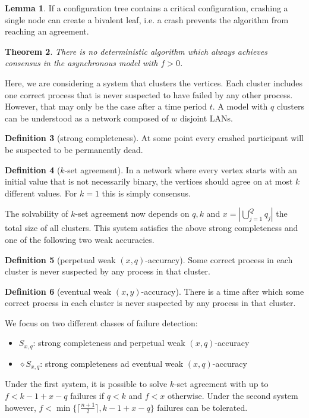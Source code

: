 \documentclass[a4paper, 12pt]{article}
\theoremstyle{plain}
\newtheorem{theorem}{Theorem}[section] %
\theoremstyle{definition}
\newtheorem{definition}[theorem]{Definition} %
\theoremstyle{lemma}
\newtheorem{lemma}[theorem]{Lemma}
\theoremstyle{remark}
\theoremstyle{corollary}
\theoremstyle{example}
\begin{document}
	\begin{lemma}
		If a configuration tree contains a critical configuration, crashing a single node can create a bivalent leaf, i.e. a crash prevents the algorithm from reaching an agreement.
	\end{lemma}
	\begin{theorem}
		There is no deterministic algorithm which always achieves consensus in the asynchronous model with $f>0$.
	\end{theorem}
	Here, we are considering a system that clusters the vertices. Each cluster includes one correct process that is never suspected to have failed by any other process. However, that may only be the case after a time period $t$. A model with $q$ clusters can be understood as a network composed of $w$ disjoint LANs. 
	\begin{definition}[strong completeness]
		At some point every crashed participant will be suspected to be permanently dead.
	\end{definition}
	\begin{definition}[$k$-set agreement]
		In a network where every vertex starts with an initial value that is not necessarily binary, the vertices should agree on at most $k$ different values. For $k=1$ this is simply consensus.
	\end{definition}
	The solvability of $k$-set agreement now depends on $q,k$ and $x = \left|\bigcup_{j=1}^Q q_j\right|$ the total size of all clusters. This system satisfies the above strong completeness and one of the following two weak accuracies.
	\begin{definition}[perpetual weak $(x,q)$-accuracy]
		Some correct process in each cluster is never suspected by any process in that cluster.
	\end{definition}
	\begin{definition}[eventual weak $(x,y)$-accuracy]
		There is a time after which some correct process in each cluster is never suspected by any process in that cluster.
	\end{definition}
	We focus on two different classes of failure detection:
	\begin{itemize}
		\item $S_{x,q}$: strong completeness and perpetual weak $(x,q)$-accuracy
		\item $\diamond S_{x,q}$: strong completeness ad eventual weak $(x,q)$-accuracy
	\end{itemize}
	Under the first system, it is possible to solve $k$-set agreement with up to $f<k-1+x-q$ failures if $q<k$ and $f<x$ otherwise. Under the second system however, $f<\min\{\lceil\frac{n+1}{2}\rceil,k-1+x-q\}$ failures can be tolerated.
\end{document}
